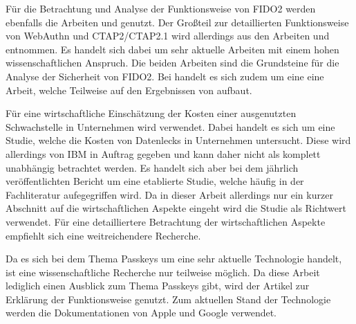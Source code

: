 Für die Betrachtung und Analyse der Funktionsweise von \ac{FIDO}2 werden ebenfalls die Arbeiten \cite{farke2020you} und \cite{lyastani2020fido2} genutzt. Der Großteil zur detaillierten Funktionsweise von WebAuthn und CTAP2/CTAP2.1 wird allerdings aus den Arbeiten \cite{barbosa2021provable} und \cite{bindel2022fido2} entnommen. Es handelt sich dabei um sehr aktuelle Arbeiten mit einem hohen wissenschaftlichen Anspruch. Die beiden Arbeiten sind die Grundsteine für die Analyse der Sicherheit von \ac{FIDO}2. Bei \cite{bindel2022fido2} handelt es sich zudem um eine eine Arbeit, welche Teilweise auf den Ergebnissen von \cite{barbosa2021provable} aufbaut.

Für eine wirtschaftliche Einschätzung der Kosten einer ausgenutzten Schwachstelle in Unternehmen wird \cite{databreach} verwendet. Dabei handelt es sich um eine Studie, welche die Kosten von Datenlecks in Unternehmen untersucht. Diese wird allerdings von IBM in Auftrag gegeben und kann daher nicht als komplett unabhängig betrachtet werden. Es handelt sich aber bei dem jährlich veröffentlichten Bericht um eine etablierte Studie, welche häufig in der Fachliteratur aufegegriffen wird. Da in dieser Arbeit allerdings nur ein kurzer Abschnitt auf die wirtschaftlichen Aspekte eingeht wird die Studie als Richtwert verwendet. Für eine detailliertere Betrachtung der wirtschaftlichen Aspekte empfiehlt sich eine weitreichendere Recherche.

Da es sich bei dem Thema Passkeys um eine sehr aktuelle Technologie handelt, ist eine wissenschaftliche Recherche nur teilweise möglich. Da diese Arbeit lediglich einen Ausblick zum Thema Passkeys gibt, wird der Artikel \cite{usecasfido} zur Erklärung der Funktionsweise genutzt. Zum aktuellen Stand der Technologie werden die Dokumentationen von Apple \cite{passkeysapple} und Google \cite{passkeysgoogle} \cite{passkeysgoogledev} verwendet.